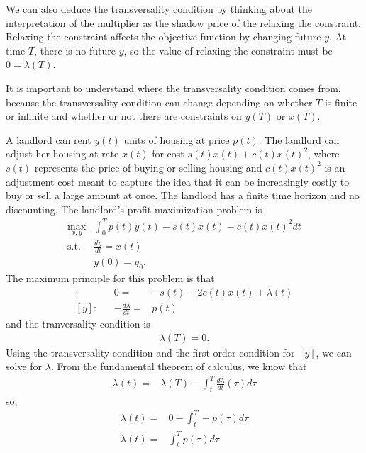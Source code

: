 We can also deduce the transversality condition by thinking about the
interpretation of the multiplier as the shadow price of the relaxing
the constraint. Relaxing the constraint affects the objective function
by changing future $y$. At time $T$, there is no future $y$, so the
value of relaxing the constraint must be $0=\lambda(T)$. 

It is important to understand where the transversality condition comes
from, because the transversality condition can change depending on
whether $T$ is finite or infinite and whether or not there are
constraints on $y(T)$ or $x(T)$. 

\begin{example}
  A landlord can rent $y(t)$ units of housing at price $p(t)$. The
  landlord can adjust her housing at rate $x(t)$ for cost
  $s(t) x(t) + c(t) x(t)^2$, where $s(t)$ represents the price of
  buying or selling housing and $c(t)x(t)^2$ is an adjustment cost
  meant to capture the idea that it can be increasingly costly to buy
  or sell a large amount at once. The landlord has a finite time
  horizon and no discounting. The landlord's profit maximization
  problem is
  \begin{align*}
    \max_{x,y} & \int_0^T p(t) y(t) - s(t) x(t) - c(t) x(t)^2 dt \\
    \text{s.t.} & \frac{dy}{dt} = x(t) \\
               & y(0) = y_0. 
  \end{align*}
  The maximum principle for this problem is that
  \begin{align*}
    [x]: && 0 = & -s(t) -2c(t)x(t) + \lambda(t) \\
    [y]: && -\frac{d\lambda}{dt} = & p(t) 
  \end{align*}
  and the tranversality condition is 
  \begin{align*}
    \lambda(T) = 0.
  \end{align*}
  Using the transversality condition and the first order condition for
  $[y]$, we can solve for $\lambda$. From the fundamental theorem of
  calculus, we know that
  \begin{align*}
    \lambda(t) = & \lambda(T) - \int_{t}^T \frac{d\lambda}{dt}(\tau)
                   d\tau 
  \end{align*}
  so, 
  \begin{align*}
    \lambda(t) = & 0 - \int_{t}^T -p(\tau)
                   d\tau \\
    \lambda(t) = & \int_{t}^T p(\tau)d\tau
  \end{align*}

\end{example}
